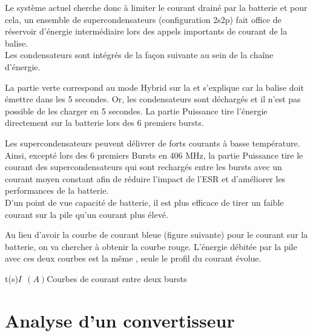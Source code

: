 Le système actuel cherche donc à limiter le courant drainé par la batterie et pour cela, un ensemble de supercondensateurs (configuration 2s2p) fait office de réservoir d'énergie intermédiaire lors des appels importants de courant de la balise.\\

Les condensateurs sont intégrés de la façon suivante au sein de la chaîne d'énergie.



La partie verte correspond au mode Hybrid sur la  et s'explique car la balise doit émettre dans les 5 secondes. Or, les condensateurs sont déchargés et il n'est pas possible de les charger en 5 secondes. La partie Puissance tire l'énergie directement sur la batterie lors des 6 premiers bursts.


Les supercondensateurs peuvent délivrer de forts courants à basse température. Ainsi, excepté lors des 6 premiers Bursts en 406 MHz, la partie Puissance tire le courant des supercondensateurs qui sont rechargés entre les bursts avec un courant moyen constant afin de réduire l'impact de l'ESR et d'améliorer les performances de la batterie.\\


D'un point de vue capacité de batterie, il est plus efficace de tirer un faible courant sur la pile qu'un courant plus élevé. 

Au lieu d'avoir la courbe de courant bleue (figure suivante) pour le courant sur la batterie, on va chercher à obtenir la courbe rouge. L'énergie débitée par la pile avec ces deux courbes est la même , seule le profil du courant évolue.


\begin{graphic}{0.8}{0.5}{0}{32}{-0.1}{1.6}{t(s)}{$I ~~(A)$}{Courbes de courant entre deux bursts}
\end{graphic}





\section{Analyse d'un convertisseur}

